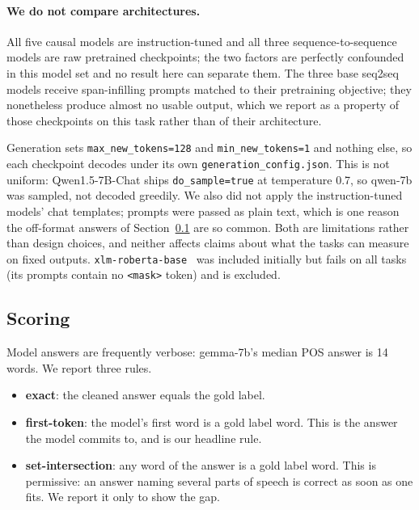 \documentclass[11pt]{article}
\begin{document}
\paragraph{We do not compare architectures.} All five causal models are
instruction-tuned and all three sequence-to-sequence models are raw pretrained
checkpoints; the two factors are perfectly confounded in this model set and no
result here can separate them. The three base seq2seq models receive
span-infilling prompts matched to their pretraining objective; they
nonetheless produce almost no usable output, which we report as a property of
those checkpoints on this task rather than of their architecture.

Generation sets \texttt{max\_new\_tokens=128} and
\texttt{min\_new\_tokens=1} and nothing else, so each checkpoint decodes
under its own \texttt{generation\_config.json}. This is not uniform:
Qwen1.5-7B-Chat ships \texttt{do\_sample=true} at temperature 0.7, so
qwen-7b was sampled, not decoded greedily. We also did not apply the
instruction-tuned models' chat templates; prompts were passed as plain text,
which is one reason the off-format answers of Section~\ref{subsec:scoring}
are so common. Both are limitations rather than design choices, and neither
affects claims about what the tasks can measure on fixed outputs.
\texttt{xlm-roberta-base}~\citep{conneau-etal-2020-unsupervised}
was included initially but fails on all tasks (its prompts contain no
\texttt{<mask>} token) and is excluded.

\subsection{Scoring}
\label{subsec:scoring}

Model answers are frequently verbose: gemma-7b's median POS answer is 14
words. We report three rules.

\begin{itemize}
  \item \textbf{exact}: the cleaned answer equals the gold label.
  \item \textbf{first-token}: the model's first word is a gold label word.
    This is the answer the model commits to, and is our headline rule.
  \item \textbf{set-intersection}: any word of the answer is a gold label
    word. This is permissive: an answer naming several parts of speech is
    correct as soon as one fits. We report it only to show the gap.
\end{itemize}
\end{document}
